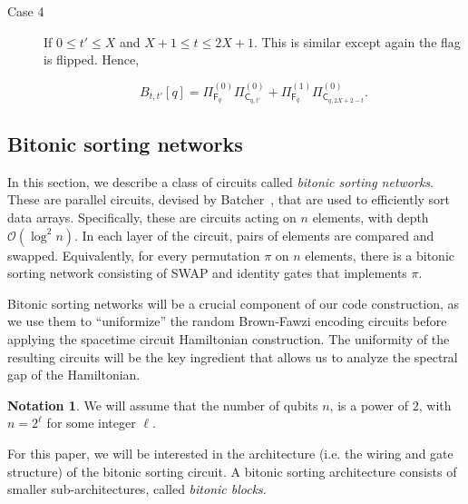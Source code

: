 \documentclass[11pt,letterpaper]{article}
\theoremstyle{definition}
\newtheorem{notation}[theorem]{Notation}
\theoremstyle{remark}
\renewcommand{\leq}{\leqslant}
\numberwithin{equation}{section}
\theoremstyle{definition}
\newcommand{\sC}{{\mathsf{C}}}
\newcommand{\sF}{{\mathsf{F}}}
\begin{document}
\begin{description}
\begin{description}
\item[Case 4] If $0 \leq t' \leq X$ and $X + 1 \leq t \leq 2X + 1$. This is similar except again the flag is flipped. Hence,

\begin{equation}
B_{t,t'}[q] = \Pi_{\sF_q}^{(0)} \Pi_{\sC_{q,t'}}^{(0)} + \Pi_{\sF_q}^{(1)} \Pi_{\sC_{q,2X + 2 - t}}^{(0)} .
\end{equation}


\end{description}

%

%
%
%
%

%
%
%
%

%
%
%
%


%
%
%
%
%
%
%
%
%
%
%
%
%
\end{description}



\subsection{Bitonic sorting networks}
\label{subsection:bitonicblock}

In this section, we describe a class of circuits called \emph{bitonic sorting networks}. These are parallel circuits, devised by Batcher~\cite{Batcher:1968:SNA:1468075.1468121}, that are used to efficiently sort data arrays. Specifically, these are circuits acting on $n$ elements, with depth $\mathcal{O}(\log^2 n)$. In each layer of the circuit, pairs of elements are compared and swapped. Equivalently, for every permutation $\pi$ on $n$ elements, there is a bitonic sorting network consisting of SWAP and identity gates that implements $\pi$.

Bitonic sorting networks will be a crucial component of our code construction, as we use them to ``uniformize'' the random Brown-Fawzi encoding circuits before applying the spacetime circuit Hamiltonian construction. The uniformity of the resulting circuits will be the key ingredient that allows us to analyze the spectral gap of the Hamiltonian.

%

%

\begin{notation}
We will assume that the number of qubits $n$, is a power of $2$, with $n = 2^\ell$ for some integer $\ell$.
\end{notation}

%
%

For this paper, we will be interested in the architecture (i.e. the wiring and gate structure) of the bitonic sorting circuit. A bitonic sorting architecture consists of smaller sub-architectures, called \emph{bitonic blocks}.
\end{document}
